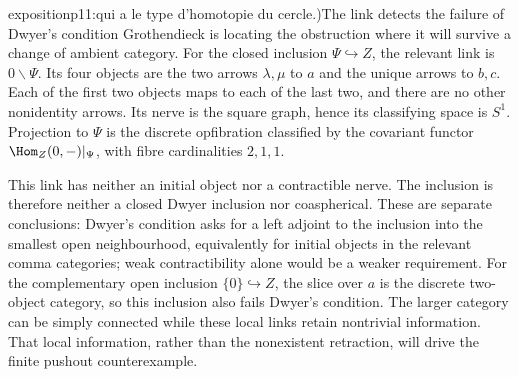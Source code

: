\begin{dcomment}{exposition}{p11:qui a le type d'homotopie du cercle.)}{The link detects the failure of Dwyer's condition}
Grothendieck is locating the obstruction where it will survive a change of ambient category. For the closed inclusion $\Psi\hookrightarrow Z$, the relevant link is $0\backslash\Psi$. Its four objects are the two arrows $\lambda,\mu$ to $a$ and the unique arrows to $b,c$. Each of the first two objects maps to each of the last two, and there are no other nonidentity arrows. Its nerve is the square graph, hence its classifying space is $S^1$. Projection to $\Psi$ is the discrete opfibration classified by the covariant functor $\Hom_Z(0,-)|_\Psi$, with fibre cardinalities $2,1,1$.

This link has neither an initial object nor a contractible nerve. The inclusion is therefore neither a closed Dwyer inclusion nor coaspherical. These are separate conclusions: Dwyer's condition asks for a left adjoint to the inclusion into the smallest open neighbourhood, equivalently for initial objects in the relevant comma categories; weak contractibility alone would be a weaker requirement. For the complementary open inclusion $\{0\}\hookrightarrow Z$, the slice over $a$ is the discrete two-object category, so this inclusion also fails Dwyer's condition. The larger category can be simply connected while these local links retain nontrivial information. That local information, rather than the nonexistent retraction, will drive the finite pushout counterexample.
\end{dcomment}

